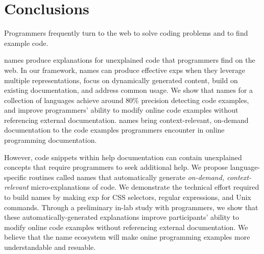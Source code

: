 \section{Conclusions}

Programmers frequently turn to the web to solve coding problems and to find example code.
\begin{changes}
\Glspl{name} produce explanations for unexplained code that programmers find on the web.
In our framework, \Glspl{name} can produce effective \glspl{exp} when they leverage multiple representations, focus on dynamically generated content, build on existing documentation, and address common usage.
We show that \Glspl{name} for a collection of languages achieve around 80\% precision detecting code examples, and improve programmers' ability to modify online code examples without referencing external documentation.
\Glspl{name} bring context-relevant, on-demand documentation to the code examples programmers encounter in online programming documentation.
\end{changes}

However, code snippets within  help documentation can contain unexplained concepts that require programmers to seek additional help.
We propose language-specific routines called \Glspl{name} that automatically generate \emph{on-demand, context-relevant} micro-explanations of code.
We demonstrate the technical effort required to build \Glspl{name} by making \gls{exp} for CSS selectors, regular expressions, and Unix commands.
Through a preliminary in-lab study with programmers, we show that these automatically-generated explanations improve participants' ability to modify online code examples without referencing external documentation.
We believe that the \Gls{name} ecosystem will make onine programming examples more understandable and resuable.
\fi
